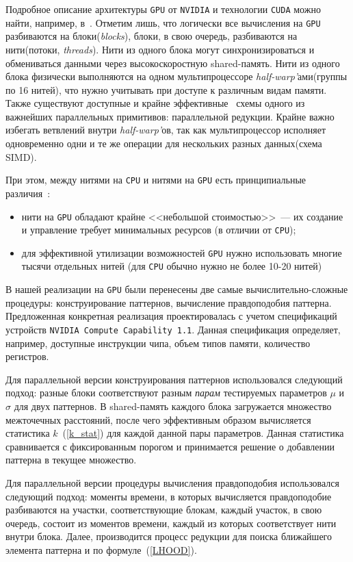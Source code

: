 \documentclass[12pt,fсeqn]{article}
\begin{document}
Подробное описание архитектуры \verb!GPU! от \verb!NVIDIA! и технологии \verb!CUDA! можно найти,
например, в~\cite{NV_doc, Boreskov_CUDA}. Отметим лишь, что логически все вычисления на \verb!GPU!
разбиваются на блоки({\em blocks}), блоки, в свою очередь, разбиваются на нити(потоки, {\em threads}). 
Нити из одного блока могут синхронизироваться и обмениваться данными через высокоскоростную shared-память.
Нити из одного блока физически выполняются на одном мультипроцессоре {\em half-warp'}ами(группы по 16 нитей), 
что нужно учитывать при доступе к различным видам памяти. Также существуют доступные и крайне эффективные~\cite{Boreskov_CUDA, NV_reduction}
схемы одного из важнейших параллельных примитивов: параллельной редукции. Крайне важно избегать ветвлений 
внутри  {\em half-warp'}ов, так как мультипроцессор исполняет  одновременно одни и те же операции
для нескольких разных данных(схема SIMD).

При этом, между нитями на \verb!CPU! и нитями на \verb!GPU! есть принципиальные различия~\cite{Boreskov_CUDA}:
\begin{itemize}
\item нити на \verb!GPU! обладают крайне <<небольшой стоимостью>>~--- их создание и управление требует минимальных ресурсов (в отличии от \verb!CPU!);
\item для эффективной утилизации возможностей \verb!GPU! нужно использовать многие тысячи отдельных нитей (для \verb!CPU! обычно нужно не более 10-20 нитей)
\end{itemize}

В нашей реализации на \verb!GPU! были перенесены две самые вычислительно-сложные процедуры: конструирование паттернов, 
вычисление правдоподобия паттерна. Предложенная конкретная реализация проектировалась с учетом спецификаций
устройств \verb!NVIDIA Compute Capability 1.1!. Данная спецификация определяет, например, доступные инструкции чипа, 
объем типов памяти, количество регистров.

Для параллельной версии конструирования паттернов использовался следующий подход: разные блоки соответствуют
разным {\em парам} тестируемых параметров $\mu$ и $\sigma$ для двух паттернов. В shared-память каждого
блока загружается множество межточечных расстояний, после чего эффективным образом вычисляется статистика $k$~(\ref{k_stat})
для каждой данной пары параметров.  Данная статистика сравнивается с фиксированным порогом и принимается решение
о добавлении паттерна в текущее множество.

Для параллельной версии процедуры вычисления правдоподобия использовался следующий подход: моменты времени, в которых вычисляется
правдоподобие разбиваются на участки, соответствующие блокам, каждый участок, в свою очередь, состоит из моментов времени,
каждый из которых соответствует нити внутри блока. Далее, производится процесс редукции для поиска ближайшего элемента
паттерна и по формуле~(\ref{LHOOD}).
\end{document}
